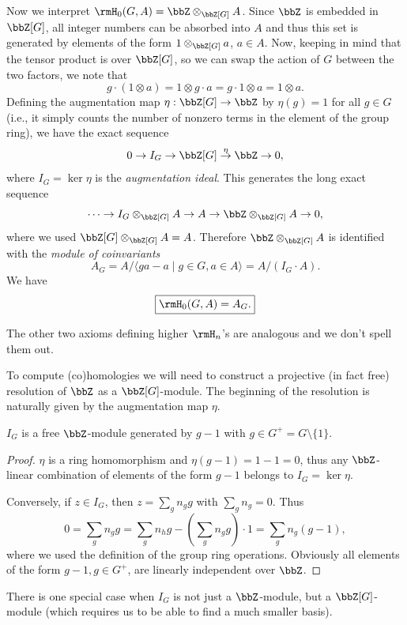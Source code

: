 Now we interpret $\rmH_0(G,A)=\bbZ\otimes_{\bbZ[G]}A$. Since $\bbZ$ is embedded in $\bbZ[G]$, all integer numbers can be absorbed into $A$  and thus this set is generated by elements of the form $1\otimes_{\bbZ[G]} a$, $a\in A$. Now, keeping in mind that the tensor product is over $\bbZ[G]$, so we can swap the action of $G$ between the two factors, we note that
\[g\cdot (1\otimes a)=1\otimes g\cdot a=g\cdot 1\otimes a=1\otimes a.\]
Defining the augmentation map $\eta:\bbZ[G]\to \bbZ$ by $\eta(g)=1$ for all $g\in G$ (i.e., it simply counts the number of nonzero terms in the element of the group ring), we have the exact sequence
\[0\to I_G\to \bbZ[G]\overset{\eta}{\to} \bbZ\to 0,\]
where $I_G=\ker \eta$ is the \emph{augmentation ideal}. This generates the long exact sequence
\[\cdots\to I_G\otimes_{\bbZ[G]}A\to A\to \bbZ\otimes_{\bbZ[G]}A\to 0,\]
where we used $\bbZ[G]\otimes_{\bbZ[G]}A=A$. Therefore $\bbZ\otimes_{\bbZ[G]}A$ is identified with the \emph{module of coinvariants}
\[A_G=A\slash \langle ga-a\mid g\in G,a\in A\rangle=A\slash (I_G\cdot A).\]
We have
\[\boxed{\rmH_0(G,A)=A_G.}\]

The other two axioms defining higher $\rmH_n$'s are analogous and we don't spell them out.

To compute (co)homologies we will need to construct a projective (in fact free) resolution of $\bbZ$ as a $\bbZ[G]$-module. The beginning of the resolution is naturally given by the augmentation map $\eta$.

\begin{thm}
    $I_G$ is a free $\bbZ$-module generated by $g-1$ with $g\in G^+=G\setminus\{1\}$.
\end{thm}
\begin{proof}
    $\eta$ is a ring homomorphism and $\eta(g-1)=1-1=0$, thus any $\bbZ$-linear combination of elements of the form $g-1$ belongs to $I_G=\ker \eta$.

    Conversely, if $z\in I_G$, then $z=\sum_g n_g g$ with $\sum_g n_g=0$. Thus 
    \[0=\sum_g n_g g=\sum_g n_hg-\left(\sum_g n_gg\right)\cdot 1=\sum_g n_g(g-1),\]
    where we used the definition of the group ring operations. Obviously all elements of the form $g-1, g\in G^+$, are linearly independent over $\bbZ$.
\end{proof}

There is one special case when $I_G$ is not just a $\bbZ$-module, but a $\bbZ[G]$-module (which requires us to be able to find a much smaller basis).

